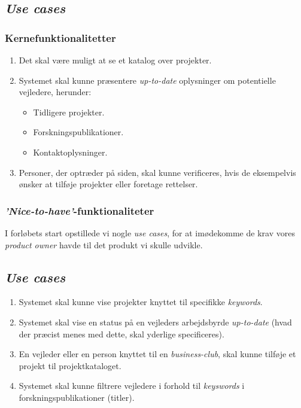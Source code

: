 \documentclass[12pt]{article}
\begin{document}
\subsection{\textit{Use cases}}

\subsubsection{Kernefunktionalitetter}
\begin{enumerate}
	\item Det skal være muligt at se et katalog over projekter.
	\item Systemet skal kunne præsentere \textit{up-to-date} oplysninger om potentielle vejledere, herunder:
	\begin{itemize}
		\item Tidligere projekter.
		\item Forskningspublikationer.
		\item Kontaktoplysninger.
	\end{itemize}
	\item Personer, der optræder på siden, skal kunne verificeres, hvis de eksempelvis ønsker at tilføje projekter eller foretage rettelser.
\end{enumerate}

\subsubsection{\textit{'Nice-to-have'}-funktionaliteter}
I forløbets start opstillede vi nogle \textit{use cases}, for at imødekomme de krav vores \textit{product owner} havde til det produkt vi skulle udvikle.

\subsection{\textit{Use cases}}
\begin{enumerate}
  \item Systemet skal kunne vise projekter knyttet til specifikke \textit{keywords}.

  \item Systemet skal vise en status på en vejleders arbejdsbyrde \textit{up-to-date} (hvad der præcist menes med dette, skal yderlige specificeres).
  \item En vejleder eller en person knyttet til en \textit{business-club}, skal kunne tilføje et projekt til projektkataloget.

	\item Systemet skal kunne filtrere vejledere i forhold til \textit{keyswords} i forskningspublikationer (titler).
\end{enumerate}
\end{document}
